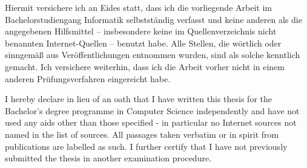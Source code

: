 \par\noindent Hiermit versichere ich an Eides statt, dass ich die vorliegende Arbeit im Bachelorstudiengang Informatik selbstständig verfasst und keine anderen als die angegebenen Hilfsmittel – insbesondere keine im Quellenverzeichnis nicht benannten Internet-Quellen – benutzt habe.
Alle Stellen, die wörtlich oder sinngemäß aus Veröffentlichungen entnommen wurden, sind als solche kenntlich gemacht.
Ich versichere weiterhin, dass ich die Arbeit vorher nicht in einem anderen Prüfungsverfahren eingereicht habe.
%
\vspace*{2em}%
%
\par\noindent I hereby declare in lieu of an oath that I have written this thesis for the Bachelor's degree programme in Computer Science independently and have not used any aids other than those specified - in particular no Internet sources not named in the list of sources.
All passages taken verbatim or in spirit from publications are labelled as such.
I further certify that I have not previously submitted the thesis in another examination procedure.

